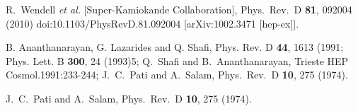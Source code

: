 \documentclass[12pt]{article}
\begin{document}
%
\begin{thebibliography}{99}

  R.~Wendell {\it et al.} [Super-Kamiokande Collaboration],
  Phys.\ Rev.\ D {\bf 81}, 092004 (2010)
  doi:10.1103/PhysRevD.81.092004
  [arXiv:1002.3471 [hep-ex]].
  
  
B. Ananthanarayan, G. Lazarides and Q. Shafi, Phys. Rev. D {\bf 44},
1613 (1991; Phys. Lett. B {\bf 300}, 24 (1993)5; Q.~Shafi and
B.~Ananthanarayan, Trieste HEP Cosmol.1991:233-244;
J.~C.~Pati and A.~Salam,
  Phys.\ Rev.\  D {\bf 10}, 275 (1974).  
  
J.~C.~Pati and A.~Salam,
  Phys.\ Rev.\  D {\bf 10}, 275 (1974).
  
  
  

\end{thebibliography}
\end{document}
